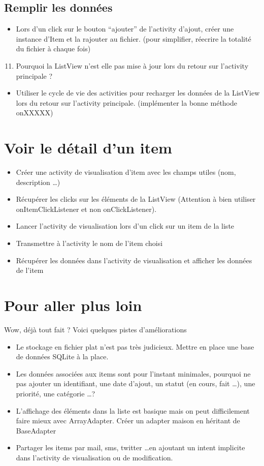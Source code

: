 \documentclass{article}
\begin{document}
 \subsection{Remplir les données}
 \begin{itemize}
  \item Lors d'un click sur le bouton ``ajouter'' de l'activity d'ajout, créer une instance d'Item et la rajouter au fichier. (pour simplifier, réecrire la totalité du fichier à chaque fois)
 \end{itemize}
  \begin{enumerate}
 \setcounter{enumi}{10}
\item Pourquoi la ListView n'est elle pas mise à jour lors du retour sur l'activity principale ?
\end{enumerate}
 \begin{itemize}
  \item Utiliser le cycle de vie des activities pour recharger les données de la ListView lors du retour sur l'activity principale. (implémenter la bonne méthode onXXXXX)
 \end{itemize}
 \section{Voir le détail d'un item}
 \begin{itemize}
  \item Créer une activity de visualisation d'item avec les champs utiles (nom, description \ldots)
  \item Récupérer les clicks sur les éléments de la ListView (Attention à bien utiliser onItemClickListener et non onClickListener).
  \item Lancer l'activity de visualisation lors d'un click sur un item de la liste
  \item Transmettre à l'activity le nom de l'item choisi
  \item Récupérer les données dans l'activity de visualisation et afficher les données de l'item
 \end{itemize}
 \section{Pour aller plus loin}
	Wow, déjà tout fait ? Voici quelques pistes d'améliorations
  \begin{itemize}
  \item Le stockage en fichier plat n'est pas très judicieux. Mettre en place une base de données SQLite à la place.
  \item Les données associées aux items sont pour l'instant minimales, pourquoi ne pas ajouter un identifiant, une date d'ajout, un statut (en cours, fait \ldots), une priorité, une catégorie \ldots ?
  \item L'affichage des éléments dans la liste est basique mais on peut difficilement faire mieux avec ArrayAdapter. Créer un adapter maison en héritant de BaseAdapter
  \item Partager les items par mail, sms, twitter \ldots en ajoutant un intent implicite dans l'activity de visualisation ou de modification.
 \end{itemize}
\end{document}
